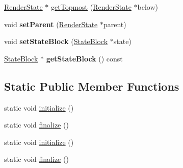 \begin{DoxyCompactItemize}
\item 
\hyperlink{classRenderState}{Render\+State} $\ast$ \hyperlink{classRenderState_ab69a68480517e64e4fee612ae57b408a}{get\+Topmost} (\hyperlink{classRenderState}{Render\+State} $\ast$below)
\item 
\mbox{\label{classRenderState_a2b56c80271b7c22a955eee179e7bc3b6}} 
void {\bfseries set\+Parent} (\hyperlink{classRenderState}{Render\+State} $\ast$parent)
\item 
\mbox{\label{classRenderState_a7f170584fc0639b61737f342997e8f56}} 
void {\bfseries set\+State\+Block} (\hyperlink{classRenderState_1_1StateBlock}{State\+Block} $\ast$state)
\item 
\mbox{\label{classRenderState_afff9cf9da0026740c18f08651ab941e5}} 
\hyperlink{classRenderState_1_1StateBlock}{State\+Block} $\ast$ {\bfseries get\+State\+Block} () const
\end{DoxyCompactItemize}
\subsection*{Static Public Member Functions}
\begin{DoxyCompactItemize}
\item 
static void \hyperlink{classRenderState_a737670247e99a7077a5f20341287e9c1}{initialize} ()
\item 
static void \hyperlink{classRenderState_a20cd68c30ab9e3fb5e763a52177cb1f6}{finalize} ()
\item 
static void \hyperlink{classRenderState_a3b8fd9c2beaab0636242434bc8e81749}{initialize} ()
\item 
static void \hyperlink{classRenderState_af0550c5aa93e0259c3adefe4c8184d01}{finalize} ()
\end{DoxyCompactItemize}
